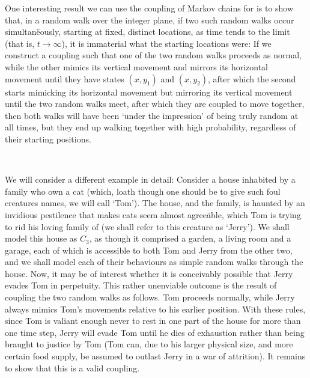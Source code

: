 	One interesting result we can use the coupling of Markov chains for is to show that, in 
	a random walk over the integer plane, if two such random walks occur simultan\"eously, 
	starting at fixed, distinct locations, as time tends to the limit (that is, $t\rightarrow
	\infty$), it is immaterial what the starting locations were: If we construct a coupling such 
	that one of the two random walks proceeds as normal, while the other mimics its vertical 
	movement and mirrors its horizontal movement until they have states $(x, y_1)$ and $(x,y_2)$,
	after which the second starts mimicking its horizontal movement but mirroring its vertical 
	movement until the two random walks meet, after which they are coupled to move together,
	then both walks will have been `under the impression' of being truly random at all times, 
	but they end up walking together with high probability, regardless of their starting 
	positions. \par \ 

	We will consider a different example in detail: Consider a house inhabited by a family who
	own a cat (which, loath though one should be to give such foul creatures names, we will call 
	`Tom'). The house, and the family, is haunted by an invidious pestilence that makes cats
	seem almost agree\"able, which Tom is trying to rid his loving family of (we shall refer 
	to this creature as `Jerry'). We shall model this house as $C_3$, as though it comprised
	a garden, a living room and a garage, each of which is accessible to both Tom and Jerry
	from the other two, and we shall model each of their behaviours as simple random walks 
	through the house. Now, it may be of interest whether it is conceivably possible that Jerry
	evades Tom in perpetuity. This rather unenviable outcome is the result of coupling the two
	random walks as follows. Tom proceeds normally, while Jerry always mimics Tom's movements 
	relative to his earlier position. With these rules, since Tom is valiant enough never to 
	rest in one part of the house for more than one time step, Jerry will evade Tom until he
	dies of exhaustion rather than being braught to justice by Tom (Tom can, due to his larger
	physical size, and more certain food supply, be assumed to outlast Jerry in a war of 
	attrition). It remains to show that this is a valid coupling.

